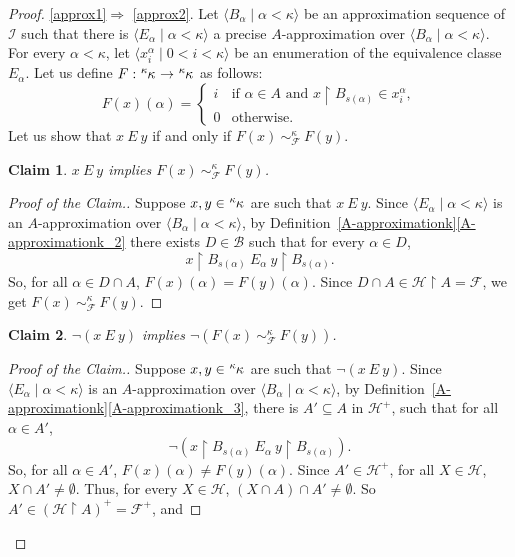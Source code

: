 \documentclass[10pt,a4paper]{amsart}
\newtheorem{claim}{Claim}
\renewcommand{\k}{\kappa}
\newcommand{\pre}[2]{\tensor[^{#1}]{#2}{}}
\newcommand{\seq}[2]{\langle #1 \mid #2 \rangle}
\begin{document}
\begin{proof}
\ref{approx1}$\Rightarrow$ \ref{approx2}.
Let $\seq{B_\alpha}{\alpha<\kappa}$ be an approximation sequence of $\mathcal{I}$ such that there is $\langle E_\alpha\mid \alpha<\kappa\rangle$ a precise $A$-approximation over $\seq{B_\alpha}{\alpha<\kappa}$. For every $\alpha<\kappa$, let $\langle x^\alpha_i\mid 0<i<\kappa\rangle$ be an enumeration of the equivalence classe $E_\alpha$. 
    Let us define $F:\pre{\k}{\kappa}\rightarrow\pre{\k}{\kappa}$ as follows:
        $$F(x)(\alpha)=\begin{cases} i &\mbox{if }\alpha\in A \mbox{ and } x\restriction B_{s(\alpha)}\in x_i^{\alpha},\\
    0 & \mbox{otherwise. }\end{cases}$$  
    Let us show that $x\ E\ y$ if and only if $F(x)\ \sim^\kappa_\mathcal{F}\ F(y)$.
    \begin{claim}
        $x\ E\ y$ implies $F(x)\ \sim^\kappa_\mathcal{F}\ F(y)$.
    \end{claim}
    \begin{proof}[Proof of the Claim.]
        Suppose $x,y\in \pre{\k}{\kappa}$ are such that $x\ E\ y$. Since $\langle E_\alpha\mid \alpha<\kappa\rangle$ is an $A$-approximation over $\seq{B_\alpha}{\alpha<\kappa}$, by Definition~\ref{A-approximationk}\ref{A-approximationk_2} there exists $D\in\mathcal{B}$ such that for every $\alpha\in D$, $$x\restriction B_{s(\alpha)}\ E_\alpha\ y\restriction B_{s(\alpha)}.$$ So, for all $\alpha\in D\cap A$, $F(x)(\alpha)=F(y)(\alpha)$. Since $D\cap A\in \mathcal{H}\restriction A=\mathcal{F}$, we get $F(x)\ \sim^\kappa_\mathcal{F}\ F(y)$.
    \end{proof}
    \begin{claim}
        $\neg(x\ E\ y)$ implies $\neg(F(x)\ \sim^\kappa_\mathcal{F}\ F(y))$.
    \end{claim}
    \begin{proof}[Proof of the Claim.]
        Suppose $x,y\in \pre{\k}{\kappa}$ are such that $\neg(x\ E\ y)$. Since $\langle E_\alpha\mid \alpha<\kappa\rangle$ is an $A$-approximation over $\seq{B_\alpha}{\alpha<\kappa}$, by Definition~\ref{A-approximationk}\ref{A-approximationk_3}, there is $A'\subseteq A$ in $\mathcal{H}^+$,  such that for all $\alpha\in A'$, $$\neg(x\restriction B_{s(\alpha)}\ E_\alpha\ y\restriction B_{s(\alpha)}).$$ So, for all $\alpha\in A'$, $F(x)(\alpha)\neq F(y)(\alpha)$. Since $A'\in\mathcal{H}^+$, for all $X\in \mathcal{H}$, $X\cap A'\neq\emptyset$. Thus, for every $X\in \mathcal{H}$, $(X\cap A)\cap A'\neq\emptyset$. So $A'\in (\mathcal{H}\restriction A)^+=\mathcal{F}^+$, and

\end{proof}
\end{proof}
\end{document}
